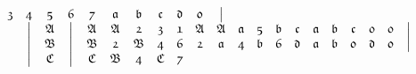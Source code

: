 \documentclass[final,12pt,a4paper,twoside,fleqn]{extbook}
\theoremstyle{definition}
\theoremstyle{remark}
\begin{document}
\begin{equation}
\begin{array}{@{}*{22}c@{}}
      {\mathfrak{3}}               &%
      {\mathfrak{4}}               &%
      {\mathfrak{5}}               &%
      {\mathfrak{6}}               &%
      {\mathfrak{7}}               &%
      {\mathfrak{a}}               &%
      {\mathfrak{b}}               &%
      {\mathfrak{c}}               &%
      {\mathfrak{d}}               &%
      {\mathfrak{0}}               &%
      \big\vert                     %
      \\ \nonumber
      {}                           &%
      \big\vert                    &%
      {\mathfrak{A}}               &%
      \big\vert                    &%
      {\mathfrak{A}}               &%
      {\mathfrak{A}}               &%
      {\mathfrak{2}}               &%
      {\mathfrak{3}}               &%
      {\mathfrak{1}}               &%
      {\mathfrak{A}}               &%
      {\mathfrak{A}}               &%
      {\mathfrak{a}}               &%
      {\mathfrak{5}}               &%
      {\mathfrak{b}}               &%
      {\mathfrak{c}}               &%
      {\mathfrak{a}}               &%
      {\mathfrak{b}}               &%
      {\mathfrak{c}}               &%
      {\mathfrak{0}}               &%
      {\mathfrak{0}}               &%
      \big\vert                     %
      \\ \nonumber
      {}            &%
      \big\vert     &%
      {\mathfrak{B}}&%
      \big\vert     &%
      {\mathfrak{B}}&%
      {\mathfrak{2}}&%
      {\mathfrak{B}}&%
      {\mathfrak{4}}&%
      {\mathfrak{6}}&%
      {\mathfrak{2}}&%
      {\mathfrak{a}}&%
      {\mathfrak{4}}&%
      {\mathfrak{b}}&%
      {\mathfrak{6}}&%
      {\mathfrak{d}}&%
      {\mathfrak{a}}&%
      {\mathfrak{b}}&%
      {\mathfrak{0}}&%
      {\mathfrak{d}}&%
      {\mathfrak{0}}&%
      \big\vert      %
      \\ \nonumber
      {}             &%
      \big\vert      &%
      {\mathfrak{C}} &%
      \big\vert      &%
      {\mathfrak{C}} &%
      {\mathfrak{B}} &%
      {\mathfrak{4}} &%
      {\mathfrak{C}} &%
      {\mathfrak{7}} &%

\end{array}
\end{equation}
\end{document}
